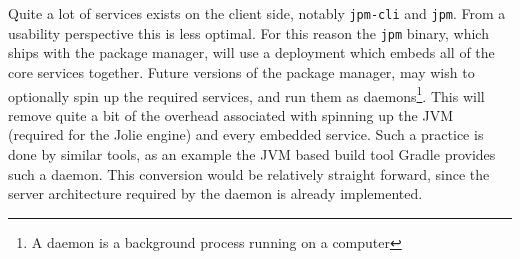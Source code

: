 Quite a lot of services exists on the client side, notably
\texttt{jpm-cli} and \texttt{jpm}. From a usability
perspective this is less optimal. For this reason the \texttt{jpm}
binary, which ships with the package manager, will use a deployment which
embeds all of the core services together. Future versions of the package
manager, may wish to optionally spin up the required services, and run them as
daemons\footnote{A daemon is a background process running on a computer}. This
will remove quite a bit of the overhead associated with spinning up the JVM
(required for the Jolie engine) and every embedded service. Such a practice is
done by similar tools, as an example the JVM based build tool Gradle provides
such a daemon\autocite{GRAA}.  This conversion would be relatively straight
forward, since the server architecture required by the daemon is already
implemented.
